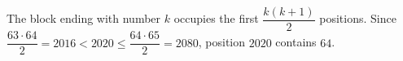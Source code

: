 The block ending with number $k$ occupies the first $\dfrac{k(k+1)}{2}$ positions. Since $\dfrac{63\cdot64}{2}=2016<2020\le\dfrac{64\cdot65}{2}=2080$, position $2020$ contains $\boxed{64}$.
